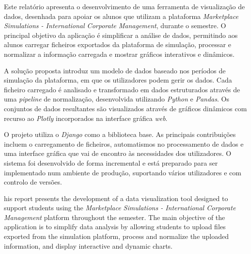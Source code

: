 




Este  relatório apresenta o desenvolvimento de uma ferramenta de visualização de dados, desenhada para apoiar os alunos que utilizam a  plataforma \textit{Marketplace Simulations - International Corporate Management}, durante o semestre. O principal objetivo da aplicação é simplificar a análise de dados, permitindo aos alunos carregar ficheiros exportados da plataforma de simulação, processar e normalizar a informação carregada e mostrar gráficos interativos e dinâmicos.

A solução proposta introduz um modelo de dados baseado nos períodos de simulação da plataforma, em que os utilizadores podem gerir os dados. Cada ficheiro carregado é analisado e transformado em dados estruturados através de uma \textit{pipeline} de normalização, desenvolvida utilizando \textit{Python} e \textit{Pandas}. Os conjuntos de dados resultantes são visualizados através de gráficos dinâmicos com recurso ao \textit{Plotly} incorporados na interface gráfica \textit{web}.

O projeto utiliza o \textit{Django} como a biblioteca base. As principais contribuições incluem o carregamento de ficheiros, automatismos no processamento de dados e uma interface gráfica que vai de encontro às necessidades dos utilizadores. O sistema foi desenvolvido de forma incremental e está preparado para ser implementado num ambiente de produção, suportando vários utilizadores e com controlo de versões.



his report presents the development of a data visualization tool designed to support students using the \textit{Marketplace Simulations - International Corporate Management} platform throughout the semester. The main objective of the application is to simplify data analysis by allowing students to upload files exported from the simulation platform, process and normalize the uploaded information, and display interactive and dynamic charts.


